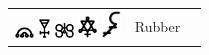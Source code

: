 \documentclass[british,final,landscape]{scrartcl}
\begin{document}
\begin{refsection}
\begin{supertabular}{p{0.3\textwidth}p{0.34\textwidth}p{0.34\textwidth}}
   \includegraphics[width=5mm]{Plant/Rubber} \includegraphics[height=5mm]{Plant/Rubber2} \includegraphics[width=5mm]{Plant/Rubber3} \includegraphics[width=5mm]{Plant/Rubber4} \includegraphics[width=5mm]{Plant/Rubber5} & Rubber & \\

\end{supertabular}
\end{refsection}
\end{document}
